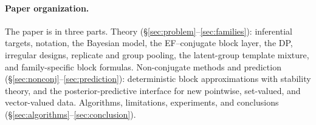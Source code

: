 \paragraph{Paper organization.}
The paper is in three parts. Theory (\S\ref{sec:problem}--\ref{sec:families}): inferential
targets, notation, the Bayesian model, the EF--conjugate block layer, the DP, irregular designs,
replicate and group pooling, the latent-group template mixture, and family-specific block
formulas. Non-conjugate methods and prediction (\S\ref{sec:nonconj}--\ref{sec:prediction}):
deterministic block approximations with stability theory, and the posterior-predictive interface
for new pointwise, set-valued, and vector-valued data. Algorithms, limitations, experiments, and
conclusions (\S\ref{sec:algorithms}--\ref{sec:conclusion}).
